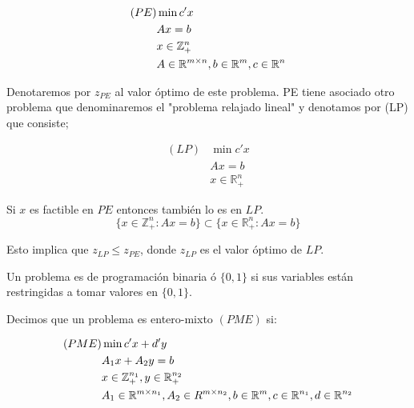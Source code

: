 \documentclass[PM.tex]{subfiles}
\begin{document}
\begin{align*}
(PE) & \min c'x\\
	 & A x = b\\
	 & x \in \mathbb{Z}_+^n\\
	 & A \in \mathbb{R}^{m \times n}, b \in \mathbb{R}^m, c \in \mathbb{R}^n
\end{align*}

Denotaremos por $z_{PE}$ al valor óptimo de este problema. PE tiene asociado otro problema que denominaremos el "problema relajado lineal" y denotamos por (LP) que consiste;

\begin{align*}
(LP) & \min c'x\\
	 & A x = b\\
	 & x \in \mathbb{R}_+^n
\end{align*}

\begin{obser}
Si $x$ es factible en $PE$ entonces también lo es en $LP$.
\[ \{x \in \mathbb{Z}_+^n : Ax=b \} \subset \{x \in \mathbb{R}_+^n : Ax=b \} \]

Esto implica que $z_{LP} ≤ z_{PE}$, donde $z_{LP} $ es el valor óptimo de $LP$.
\end{obser}

Un problema es de programación binaria ó $\{0,1\}$ si sus variables están restringidas a tomar valores en $\{0,1\}$.

Decimos que un problema es entero-mixto $(PME)$ si:

\begin{align*}
(PME) & \min c'x+d'y\\
	  & A_1 x + A_2 y = b\\
	  & x \in \mathbb{Z}_+^{n_1}, y \in \mathbb{R}_+^{n_2}\\
	  & A_1 \in \mathbb{R}^{m\times n_1}, A_2 \in R^{m \times n_2}, b \in \mathbb{R}^m, c \in \mathbb{R}^{n_1}, d \in \mathbb{R}^{n_2}
\end{align*}
\end{document}
